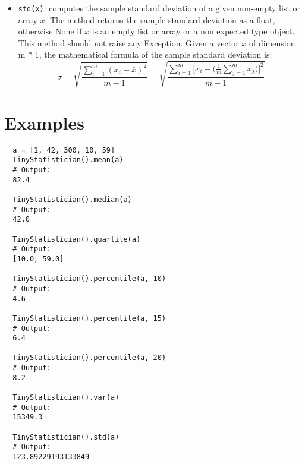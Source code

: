 \begin{itemize}
  \item \texttt{std(x)}: computes the sample standard deviation of a given non-empty list or array $x$.
        The method returns the sample standard deviation as a float,
        otherwise None if $x$ is an empty list or array or a non expected type object.
        This method should not raise any Exception.
        \newline
        Given a vector $x$ of dimension m * 1, the mathematical formula of the sample standard deviation is:
        $$
        \sigma = \sqrt{\frac{\sum_{i = 1}^{m}{(x_i - \bar{x})^2}}{m - 1}} = \sqrt{\frac{\sum_{i = 1}^{m}{[x_i - (\frac{1}{m}\sum_{j = 1}^{m}{x_j}})]^2}{m - 1}}
        $$
\end{itemize}

\section*{Examples}

\begin{verbatim}  
  a = [1, 42, 300, 10, 59]
  TinyStatistician().mean(a)
  # Output:
  82.4

  TinyStatistician().median(a)
  # Output:
  42.0

  TinyStatistician().quartile(a)
  # Output:
  [10.0, 59.0]

  TinyStatistician().percentile(a, 10)
  # Output:
  4.6

  TinyStatistician().percentile(a, 15)
  # Output:
  6.4

  TinyStatistician().percentile(a, 20)
  # Output:
  8.2

  TinyStatistician().var(a)
  # Output:
  15349.3

  TinyStatistician().std(a)
  # Output:
  123.89229193133849
\end{verbatim}

